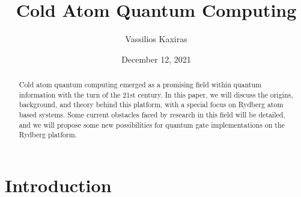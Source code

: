 \documentclass[aps,twocolumn,preprintnumbers]{revtex4}
\begin{document}
\title{Cold Atom Quantum Computing}

\author{Vassilios Kaxiras}


\date{December 12, 2021}

\begin{abstract}  

Cold atom quantum computing emerged as a promising field within quantum information with the turn of the 21st century. In this paper, we will discuss the origins, background, and theory behind this platform, with a special focus on Rydberg atom based systems. Some current obstacles faced by research in this field will be detailed, and we will propose some new possibilities for quantum gate implementations on the Rydberg platform.

\end{abstract}

\maketitle 

\section{Introduction}
\end{document}
